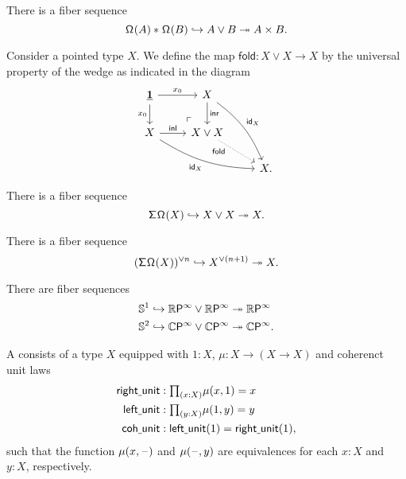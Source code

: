 \begin{prp}
There is a fiber sequence 
\begin{equation*}
{\mathsf{\Omega}^{}(A)}\ast_{}{\mathsf{\Omega}^{}(B)}\hookrightarrow A\vee B\twoheadrightarrow A\times B.
\end{equation*}
\end{prp}

\begin{defn}
Consider a pointed type $X$. We define the map $\mathsf{fold}:X\vee X\to X$ by the universal property of the wedge as indicated in the diagram
\begin{equation*}
\begin{tikzcd}
\unit \arrow[d,swap,"x_0"] \arrow[r,"x_0"] \arrow[dr, phantom, "\ulcorner", very near end] & X \arrow[d,"\inr"] \arrow[ddr,bend left=15,"{\idfunc[X]}"] \\
X \arrow[r,"\inl"] \arrow[drr,bend right=15,swap,"{\idfunc[X]}"] & X\vee X \arrow[dr,densely dotted,near start,swap,"\mathsf{fold}"] \\
& & X.
\end{tikzcd}
\end{equation*}
\end{defn}

\begin{prp}
There is a fiber sequence
\begin{equation*}
\mathsf{\Sigma}^{}\mathsf{\Omega}^{}(X) \hookrightarrow X\vee X \twoheadrightarrow X.
\end{equation*}
\end{prp}

\begin{prp}
There is a fiber sequence
\begin{equation*}
(\mathsf{\Sigma}^{}\mathsf{\Omega}^{}(X))^{\vee n} \hookrightarrow X^{\vee (n+1)} \twoheadrightarrow X.
\end{equation*}
\end{prp}

\begin{rmk}
There are fiber sequences
\begin{align*}
\mathbb{S}^{1} \hookrightarrow \mathbb{R}\mathsf{P}^{\infty}\vee \mathbb{R}\mathsf{P}^{\infty} & \twoheadrightarrow \mathbb{R}\mathsf{P}^{\infty} \\
\mathbb{S}^{2} \hookrightarrow \mathbb{C}\mathsf{P}^{\infty}\vee \mathbb{C}\mathsf{P}^{\infty} & \twoheadrightarrow \mathbb{C}\mathsf{P}^{\infty}.
\end{align*}
\end{rmk}

\begin{defn}\label{defn:coh_hspace}
A  consists of a type $X$ equipped with $1:X$, $\mu:X \to (X \to X)$ and coherenct unit laws
\begin{align*}
\mathsf{right\usc{}unit} & : \prd{x: X} \mu(x,1)= x \\
\mathsf{left\usc{}unit} & : \prd{y:X} \mu(1,y) = y \\
\mathsf{coh\usc{}unit} & : \mathsf{left\usc{}unit}(1)=\mathsf{right\usc{}unit}(1),
\end{align*}
such that the function $\mu(x,\mathord{\hspace{1pt}\text{--}\hspace{1pt}})$ and $\mu(\mathord{\hspace{1pt}\text{--}\hspace{1pt}},y)$ are equivalences for each $x:X$ and $y:X$, respectively.
\end{defn}

